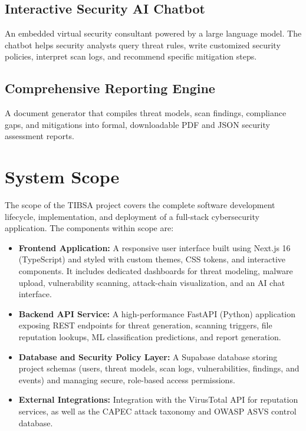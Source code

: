 \subsection{Interactive Security AI Chatbot}
An embedded virtual security consultant powered by a large language model. The chatbot helps security analysts query threat rules, write customized security policies, interpret scan logs, and recommend specific mitigation steps.

\subsection{Comprehensive Reporting Engine}
A document generator that compiles threat models, scan findings, compliance gaps, and mitigations into formal, downloadable PDF and JSON security assessment reports.

\section{System Scope}

The scope of the TIBSA project covers the complete software development lifecycle, implementation, and deployment of a full-stack cybersecurity application. The components within scope are:

\begin{itemize}
    \item \textbf{Frontend Application:} A responsive user interface built using Next.js 16 (TypeScript) and styled with custom themes, CSS tokens, and interactive components. It includes dedicated dashboards for threat modeling, malware upload, vulnerability scanning, attack-chain visualization, and an AI chat interface.
    \item \textbf{Backend API Service:} A high-performance FastAPI (Python) application exposing REST endpoints for threat generation, scanning triggers, file reputation lookups, ML classification predictions, and report generation.
    \item \textbf{Database and Security Policy Layer:} A Supabase database storing project schemas (users, threat models, scan logs, vulnerabilities, findings, and events) and managing secure, role-based access permissions.
    \item \textbf{External Integrations:} Integration with the VirusTotal API for reputation services, as well as the CAPEC attack taxonomy and OWASP ASVS control database.
\end{itemize}

